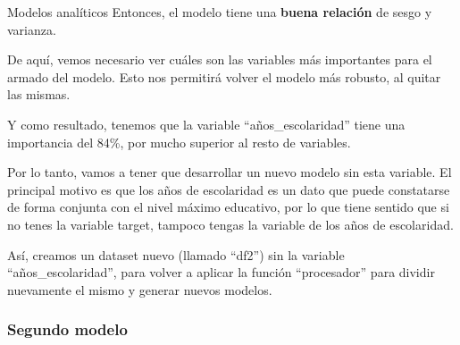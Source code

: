 \documentclass[pdf]{beamer}
\begin{document}
\begin{frame}{Modelos analíticos}
    Entonces, el modelo tiene una \textbf{buena relación} de sesgo y varianza.

    De aquí, vemos necesario ver cuáles son las variables más importantes para el armado del modelo. Esto nos permitirá volver el modelo más robusto, al quitar las mismas. 

    Y como resultado, tenemos que la variable ``años\_escolaridad'' tiene una importancia del 84\%, por mucho superior al resto de variables.


    Por lo tanto, vamos a tener que desarrollar un nuevo modelo sin esta variable. El principal motivo es que los años de escolaridad es un dato que puede constatarse de forma conjunta con el nivel máximo educativo, por lo que tiene sentido que si no tenes la variable target, tampoco tengas la variable de los años de escolaridad.

    Así, creamos un dataset nuevo (llamado ``df2'') sin la variable ``años\_escolaridad'', para volver a aplicar la función ``procesador'' para dividir nuevamente el mismo y generar nuevos modelos.

\end{frame}

        \subsubsection{Segundo modelo}
\end{document}
